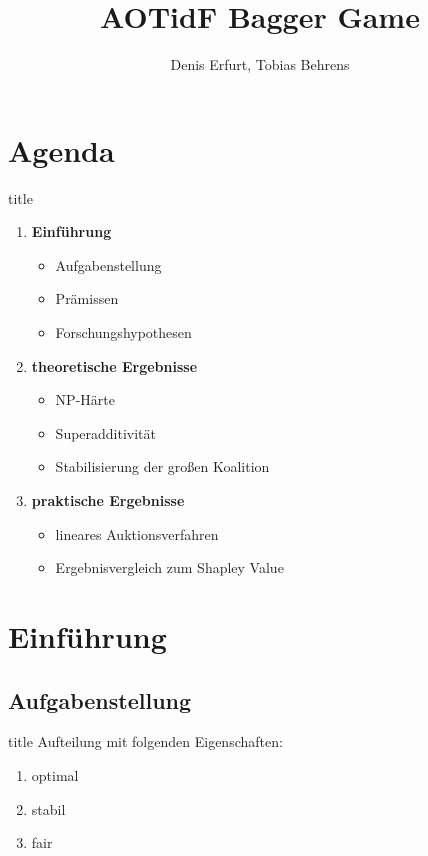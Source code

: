 \documentclass[c]{beamer}
\title[] {AOTidF Bagger Game}
\author[Denis Erfurt, Tobias Behrens] %
{Denis Erfurt, Tobias Behrens}
\theoremstyle{break}
\begin{document}
  \frame{\titlepage} %

  \section*{Agenda}
  \begin{frame}{title} %
    \begin{enumerate}
      \item \textbf{Einführung}
      \begin{itemize}
        \item Aufgabenstellung
        \item Prämissen
        \item Forschungshypothesen
      \end{itemize}
      \item \textbf{theoretische Ergebnisse}
      \begin{itemize}
        \item NP-Härte
        \item Superadditivität
        \item Stabilisierung der großen Koalition
      \end{itemize}
      \item \textbf{praktische Ergebnisse}
      \begin{itemize}
        \item lineares Auktionsverfahren
        \item Ergebnisvergleich zum Shapley Value
      \end{itemize}
    \end{enumerate}
  \end{frame}


  \section*{Einführung}
  \subsection*{Aufgabenstellung}
  \begin{frame}{title} %
    Aufteilung mit folgenden Eigenschaften:
    \begin{enumerate}
      \item optimal
      \item stabil
      \item fair
    \end{enumerate}
  \end{frame}
\end{document}
